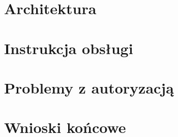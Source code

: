 \section{Architektura}\label{sec:architektura}


\section{Instrukcja obsługi}\label{sec:instrukcja}


\section{Problemy z autoryzacją}\label{sec:post_mortem}


\section{Wnioski końcowe}\label{sec:wnioski}






